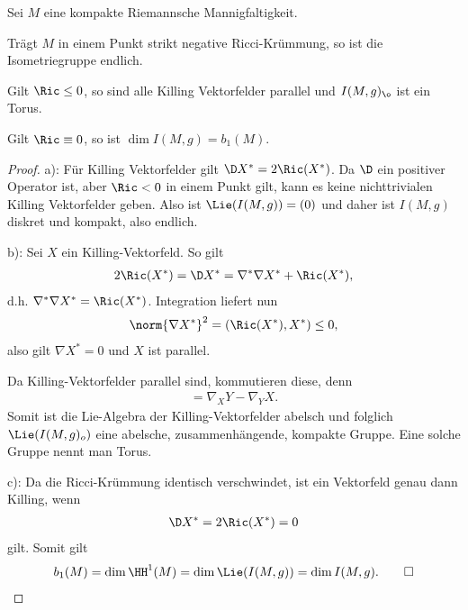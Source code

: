 \documentclass[%
	paper=a5,%
	fleqn,%
	DIV=18,%
	BCOR=0mm,
	fontsize=11pt,
	titlepage=false,%
	bibliography=totoc,
	DIV=18,%
	twoside=true,
	pdftitle=Riemannsche Geometrie,
	pdfauthor=Uwe Semmelmann,
	numbers=noendperiod]%
	{scrbook}
\begin{document}
\begin{cor}
Sei $M$ eine kompakte Riemannsche Mannigfaltigkeit.
\begin{propenum}
\item Trägt $M$ in einem Punkt strikt negative Ricci-Krümmung, so ist die Isometriegruppe endlich.
\item Gilt $\Ric \le 0$, so sind alle Killing Vektorfelder parallel und $I(M,g)_{\o}$ ist ein Torus.
\item Gilt $\Ric \equiv 0$, so ist $\dim I(M,g) = b_{1}(M)$.\fish
\end{propenum}
\end{cor}
\begin{proof}
a): Für Killing Vektorfelder gilt $\D X^* = 2\Ric(X^*)$. Da $\D$ ein positiver Operator ist, aber $\Ric < 0$ in einem Punkt gilt, kann es keine nichttrivialen Killing Vektorfelder geben. Also ist $\Lie(I(M,g)) = (0)$ und daher ist $I(M,g)$ diskret und kompakt, also endlich.

b): Sei $X$ ein Killing-Vektorfeld. So gilt
\begin{align*}
2\Ric(X^*) = \D X^* = \nabla^*\nabla X^* + \Ric(X^*),
\end{align*}
d.h. $\nabla^*\nabla X^* = \Ric(X^*)$. Integration liefert nun
\begin{align*}
\norm{\nabla X^*}^2 = (\Ric(X^*),X^*) \le 0,
\end{align*}
also gilt $\nabla X^* = 0$ und $X$ ist parallel.

Da Killing-Vektorfelder parallel sind, kommutieren diese, denn
\begin{align*}
[X,Y] = \nabla_{X}Y - \nabla_{Y}X.
\end{align*}
Somit ist die Lie-Algebra der Killing-Vektorfelder abelsch und folglich $\Lie(I(M,g)_{o})$ eine abelsche, zusammenhängende, kompakte Gruppe. Eine solche Gruppe nennt man Torus.

c): Da die Ricci-Krümmung identisch verschwindet, ist ein Vektorfeld genau dann Killing, wenn
\begin{align*}
\D X^* = 2\Ric(X^*) = 0
\end{align*}
gilt. Somit gilt
\begin{align*}
b_{1}(M) = \dim\HH^1(M) = \dim\Lie(I(M,g)) = \dim I(M,g).\qed
\end{align*}
\end{proof}

\printindex



\end{document}
